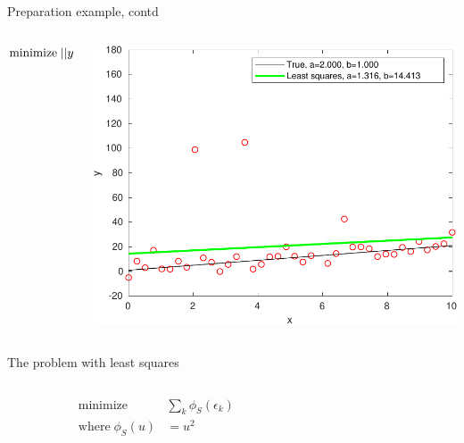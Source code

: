 \documentclass[presentation,aspectratio=169]{beamer}
\begin{document}
\begin{frame}[label=sec-2-5]{Preparation example, contd}
\begin{columns}
\begin{column}{0.4\textwidth}
\begin{equation*}
 \text{minimize} \; ||y - ax - b||_2\\
\end{equation*}
\end{column}
\begin{column}{0.6\textwidth}
\begin{center}
\includegraphics[width=\linewidth]{least_squares_regression}
\end{center}
\end{column}
\end{columns}
\end{frame}

\begin{frame}[label=sec-2-6]{The problem with least squares}
\begin{columns}
\begin{column}{0.4\textwidth}
\begin{align*}
 \text{minimize} \; &\sum_k \phi_{S}(\epsilon_k)\\
 \text{where} \; \phi_S(u) &= u^2
\end{align*}
\end{column}

\begin{column}{0.6\textwidth}

\begin{center}
\end{center}
\end{column}
\end{columns}
\end{frame}
\end{document}
